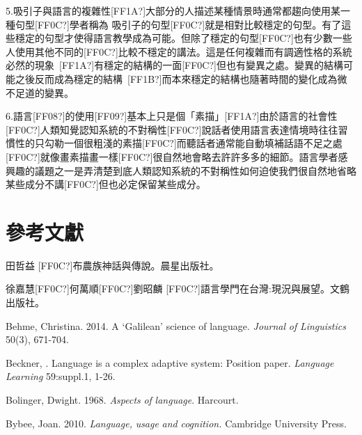 5.吸引子與語言的複雜性[FF1A?]大部分的人描述某種情景時通常都趨向使用某一種句型[FF0C?]學者稱為 吸引子的句型[FF0C?]就是相對比較穩定的句型。有了這些穩定的句型才使得語言教學成為可能。但除了穩定的句型[FF0C?]也有少數一些人使用其他不同的[FF0C?]比較不穩定的講法。這是任何複雜而有調適性格的系統必然的現象~[FF1A?]有穩定的結構的一面[FF0C?]但也有變異之處。變異的結構可能之後反而成為穩定的結構~[FF1B?]而本來穩定的結構也隨著時間的變化成為微不足道的變異。

6.語言[FF08?]的使用[FF09?]基本上只是個「素描」[FF1A?]由於語言的社會性[FF0C?]人類知覺認知系統的不對稱性[FF0C?]說話者使用語言表達情境時往往習慣性的只勾勒一個很粗淺的素描[FF0C?]而聽話者通常能自動填補話語不足之處[FF0C?]就像畫素描畫一樣[FF0C?]很自然地會略去許許多多的細節。語言學者感興趣的議題之一是弄清楚到底人類認知系統的不對稱性如何迫使我們很自然地省略某些成分不講[FF0C?]但也必定保留某些成分。  

\section{參考文獻}  %
\begin{stylereferences}
田哲益 [FF0C?]布農族神話與傳說。晨星出版社。
\end{stylereferences}

\begin{stylereferences}
徐嘉慧[FF0C?]何萬順[FF0C?]劉昭麟 [FF0C?]語言學門在台灣:現況與展望。文鶴出版社。
\end{stylereferences}

\begin{stylereferences}
Behme, Christina. 2014. A ‘Galilean’ science of language. \textit{Journal} \textit{of} \textit{Linguistics} 50(3), 671-704.
\end{stylereferences}

\begin{stylereferences}
Beckner, \citealt{ClayEtAl2009}. Language is a complex adaptive system: Position paper. \textit{Language} \textit{Learning} 59:suppl.1, 1-26.
\end{stylereferences}

\begin{stylereferences}
Bolinger, Dwight. 1968. \textit{Aspects} \textit{of} \textit{language}. Harcourt. 
\end{stylereferences}

\begin{stylereferences}
Bybee, Joan. 2010. \textit{Language,} \textit{usage} \textit{and} \textit{cognition.} Cambridge University Press.
\end{stylereferences}

